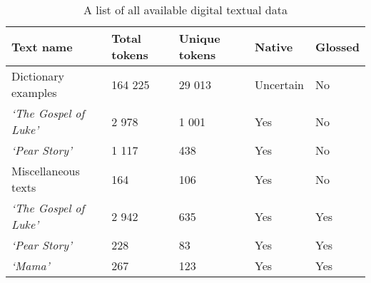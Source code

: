 \begin{table}[!h]
    \begin{center}
        \begin{tabular}{|l|l|l|l|l|}
            \hline
            \textbf{Text name} & \textbf{Total tokens} & \textbf{Unique tokens} & \textbf{Native} & \textbf{Glossed} \\
            \hline
            Dictionary examples & 164 225 & 29 013 & Uncertain & No \\
            \hline
            \textit{`The Gospel of Luke'} & 2 978 & 1 001 & Yes & No \\
            \textit{`Pear Story'} & 1 117 & 438 & Yes & No \\
            Miscellaneous texts & 164 & 106 & Yes & No \\
            \hline
            \textit{`The Gospel of Luke'} & 2 942 & 635 & Yes & Yes \\
            \textit{`Pear Story'} & 228 & 83 & Yes & Yes \\
            \textit{`Mama'} & 267 & 123 & Yes & Yes \\
            \hline
        \end{tabular}
        \label{Tab:all_texts}
        \caption{A list of all available digital textual data }
    \end{center}
\end{table}
